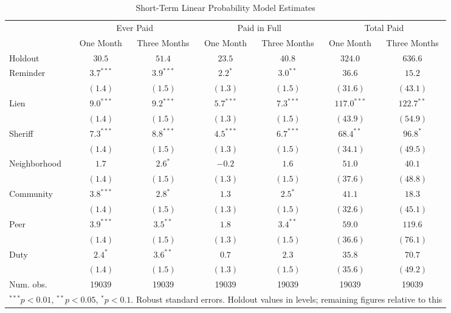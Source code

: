 \begin{table}[htb]
\caption{Short-Term Linear Probability Model Estimates}
\begin{center}
\begin{tabular}{l c c c c c c }
\hline
 & \multicolumn{2}{c}{Ever Paid} & \multicolumn{2}{c}{Paid in Full} & \multicolumn{2}{c}{Total Paid} \\
 & One Month & Three Months & One Month & Three Months & One Month & Three Months \\
Holdout      & $30.5$ & $51.4$ & $23.5$ & $40.8$ & $324.0$ & $636.6$ \\
\hline
Reminder     & $3.7^{***}$  & $3.9^{***}$  & $2.2^{*}$    & $3.0^{**}$   & $36.6$        & $15.2$        \\
             & $(1.4)$      & $(1.5)$      & $(1.3)$      & $(1.5)$      & $(31.6)$      & $(43.1)$      \\
Lien         & $9.0^{***}$  & $9.2^{***}$  & $5.7^{***}$  & $7.3^{***}$  & $117.0^{***}$ & $122.7^{**}$  \\
             & $(1.4)$      & $(1.5)$      & $(1.3)$      & $(1.5)$      & $(43.9)$      & $(54.9)$      \\
Sheriff      & $7.3^{***}$  & $8.8^{***}$  & $4.5^{***}$  & $6.7^{***}$  & $68.4^{**}$   & $96.8^{*}$    \\
             & $(1.4)$      & $(1.5)$      & $(1.3)$      & $(1.5)$      & $(34.1)$      & $(49.5)$      \\
Neighborhood & $1.7$        & $2.6^{*}$    & $-0.2$       & $1.6$        & $51.0$        & $40.1$        \\
             & $(1.4)$      & $(1.5)$      & $(1.3)$      & $(1.5)$      & $(37.6)$      & $(48.8)$      \\
Community    & $3.8^{***}$  & $2.8^{*}$    & $1.3$        & $2.5^{*}$    & $41.1$        & $18.3$        \\
             & $(1.4)$      & $(1.5)$      & $(1.3)$      & $(1.5)$      & $(32.6)$      & $(45.1)$      \\
Peer         & $3.9^{***}$  & $3.5^{**}$   & $1.8$        & $3.4^{**}$   & $59.0$        & $119.6$       \\
             & $(1.4)$      & $(1.5)$      & $(1.3)$      & $(1.5)$      & $(36.6)$      & $(76.1)$      \\
Duty         & $2.4^{*}$    & $3.6^{**}$   & $0.7$        & $2.3$        & $35.8$        & $70.7$        \\
             & $(1.4)$      & $(1.5)$      & $(1.3)$      & $(1.5)$      & $(35.6)$      & $(49.2)$      \\
\hline
Num. obs.    & 19039        & 19039        & 19039        & 19039        & 19039         & 19039         \\
\hline
\multicolumn{7}{l}{\scriptsize{$^{***}p<0.01$, $^{**}p<0.05$, $^*p<0.1$. Robust standard errors. Holdout values in levels; remaining figures relative to this}}
\end{tabular}
\label{sh_lin}
\end{center}
\end{table}

